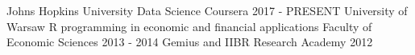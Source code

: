 \begin{cventries}
  \cventryshort
    {Johns Hopkins University}
    {Data Science}
    {Coursera}
    {2017 - PRESENT}
  \cventryshort
    {University of Warsaw}
    {R programming in economic and financial applications}
    {Faculty of Economic Sciences}
    {2013 - 2014}
  \cventryshort
    {Gemius and IIBR}
    {Research Academy}
    {}
    {2012}
\end{cventries}
